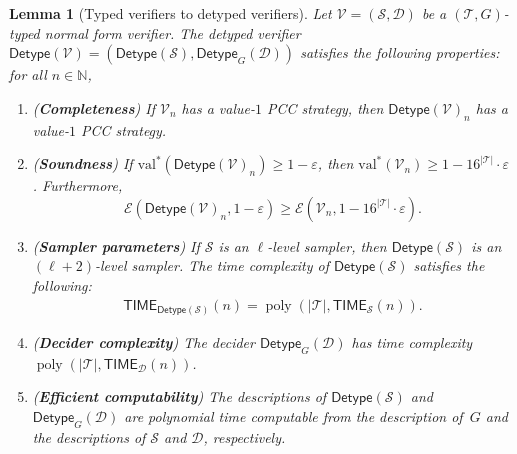 \documentclass[11pt]{article}
\newtheorem{lemma}[theorem]{Lemma}
\theoremstyle{definition}
\newcommand{\N}{\ensuremath{\mathbb{N}}}
\DeclareMathOperator{\poly}{poly}
\newcommand{\val}{\ensuremath{\mathrm{val}}}
\newcommand{\eps}{\varepsilon}
\newcommand{\sampler}{\mathcal{S}}
\newcommand{\decider}{\mathcal{D}}
\newcommand{\verifier}{\mathcal{V}}
\newcommand{\type}{\mathcal{T}}
\newcommand{\Ent}{\mathscr{E}}
\newcommand{\TIME}{\mathsf{TIME}}
\newcommand{\tmstyle}[1]{\ensuremath{\mathsf{#1}}}
\newcommand{\detype}{\tmstyle{Detype}}
\begin{document}
\begin{lemma}[Typed verifiers to detyped verifiers]
  \label{lem:detyping-verifiers}
  Let $\verifier = (\sampler,\decider)$ be a $(\type,G)$-typed normal form
  verifier.
  The detyped verifier $\detype(\verifier) =
  (\detype(\sampler),\detype_G(\decider))$ satisfies the following properties:
  for all $n \in \N$,
  \begin{enumerate}
	\item (\textbf{Completeness}) If $\verifier_n$ has a value-$1$ PCC strategy,
    then $\detype(\verifier)_n$ has a value-$1$ PCC strategy.
	\item (\textbf{Soundness}) If $\val^*(\detype(\verifier)_n) \geq 1 - \eps$,
    then $\val^*(\verifier_n) \geq 1 - 16^{|\type|} \cdot \eps$.
    Furthermore,
    \[
      \Ent(\detype(\verifier)_n,1 - \eps) \geq
      \Ent(\verifier_n,1 - 16^{|\type|} \cdot\eps).
    \]
	\item (\textbf{Sampler parameters}) If $\sampler$ is an $\ell$-level sampler,
    then $\detype(\sampler)$ is an $(\ell+2)$-level sampler.
    The time complexity of $\detype(\sampler)$ satisfies the
    following:
    \begin{gather*}
      \TIME_{\detype(\sampler)}(n) = \poly(|\type|,\TIME_\sampler(n)).
    \end{gather*}
	\item (\textbf{Decider complexity}) The decider $\detype_G(\decider)$ has time
    complexity $\poly(|\type|,\TIME_\decider(n))$.
	\item (\textbf{Efficient computability}) The descriptions of
    $\detype(\sampler)$ and $\detype_G(\decider)$ are polynomial time
    computable from the description of~$G$ and the descriptions of $\sampler$
    and $\decider$, respectively.
  \end{enumerate}
\end{lemma}
\end{document}
